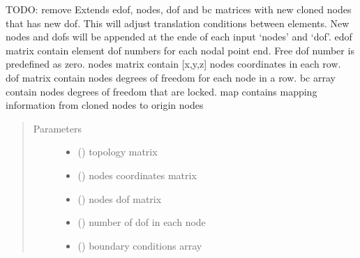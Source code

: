 \documentclass[letterpaper,10pt,english]{sphinxmanual}
\begin{document}

\begin{fulllineitems}
\label{\detokenize{api:beamon.core.make_joints}}
TODO: remove
Extends edof, nodes, dof and bc matrices with new cloned nodes that has new dof.
This will adjust translation conditions between elements.
New nodes and dofs will be appended at the ende of each input ‘nodes’ and ‘dof’.
edof matrix contain element dof numbers for each nodal point end. Free dof number is predefined as zero.
nodes matrix contain {[}x,y,z{]} nodes coordinates in each row.
dof matrix contain nodes degrees of freedom for each node in a row.
bc array contain nodes degrees of freedom that are locked.
map contains mapping information from cloned nodes to origin nodes
\begin{quote}\begin{description}
\item[{Parameters}] \leavevmode\begin{itemize}
\item {} 
 () \textendash{} topology matrix

\item {} 
 () \textendash{} nodes coordinates matrix

\item {} 
 () \textendash{} nodes dof matrix

\item {} 
 (\sphinxstyleliteralemphasis{\sphinxupquote{ (}}\sphinxstyleliteralemphasis{\sphinxupquote{)}}) \textendash{} number of dof in each node

\item {} 
 () \textendash{} boundary conditions array


\end{itemize}
\end{description}
\end{quote}
\end{fulllineitems}
\end{document}
